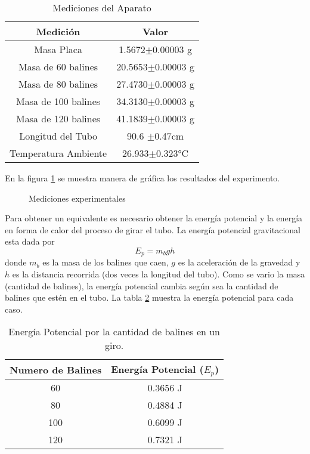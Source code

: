 \documentclass[12pt]{article}
\begin{document}
	\begin{table}[H]
		\centering
		\begin{tabular}{|c|c|}
			\hline
			\textbf{Medición} & \textbf{Valor} \\ \hline
			 Masa Placa & 1.5672$\pm$0.00003 g \\ \hline
			 Masa de 60 balines & 20.5653$\pm$0.00003 g \\ \hline
			 Masa de 80 balines & 27.4730$\pm$0.00003 g \\ \hline
			 Masa de 100 balines & 34.3130$\pm$0.00003 g \\ \hline
			 Masa de 120 balines & 41.1839$\pm$0.00003 g \\ \hline
			 Longitud del Tubo & 90.6 $\pm$0.47cm  \\ \hline
			 Temperatura Ambiente & 26.933$\pm$0.323°C \\ \hline
		\end{tabular}
		\caption{Mediciones del Aparato}
		\label{tab:Med}
	\end{table}
	
En la figura \ref{fig:med} se muestra manera de gráfica los resultados del experimento.

	\begin{figure}[H]
		\centering
		\caption{Mediciones experimentales}
		\label{fig:med}
	\end{figure}

Para obtener un equivalente es necesario obtener la energía potencial y la energía en forma de calor del proceso de girar el tubo. La energía potencial gravitacional esta dada por 
\begin{equation}
\label{eq:poten}
E_p = m_bgh
\end{equation}
donde $m_b$ es la masa de los balines que caen, $g$ es la aceleración de la gravedad y $h$ es la distancia recorrida (dos veces la longitud del tubo). Como se vario la masa (cantidad de balines), la energía potencial cambia según sea la cantidad de balines que estén en el tubo. La tabla \ref{tab:PE} muestra la energía potencial para cada caso.
	
	\begin{table}[H]
		\centering
		\begin{tabular}{|c|c|}
			\hline
			\textbf{Numero de Balines} & \textbf{Energía Potencial} ($E_p$) \\ \hline
			60   & 0.3656  J \\ \hline
			80   & 0.4884  J \\ \hline
			100  & 0.6099  J \\ \hline
			120  & 0.7321  J \\ \hline
		\end{tabular}
		\caption{Energía Potencial por la cantidad de balines en un giro.}
		\label{tab:PE}
	\end{table}
	
\end{document}

